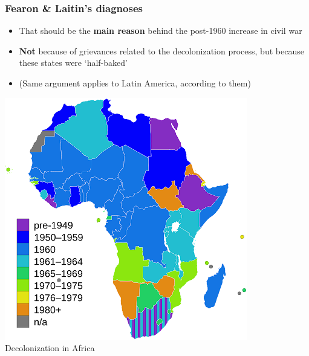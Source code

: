 \documentclass[aspectratio=43]{beamer}
\begin{document}
\begin{frame}
\frametitle{Fearon \& Laitin's diagnoses}
\centering

\begin{minipage}{0.58\textwidth}\centering
\begin{itemize}
  \item That should be the \textbf{main reason} behind the post-1960 increase in civil war
  \item \textbf{Not} because of grievances related to the decolonization process, but because these states were `half-baked'
  \item (Same argument applies to Latin America, according to them)
\end{itemize}
\end{minipage}\hfill
\begin{minipage}{0.4\textwidth}\centering
\includegraphics[width = \textwidth]{img/africa_decolonization}\\
Decolonization in Africa
\end{minipage}

\end{frame}
\end{document}
